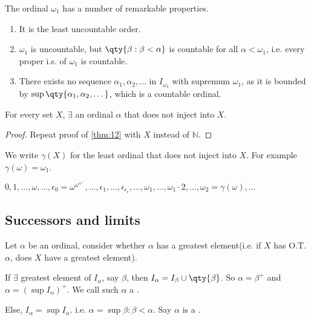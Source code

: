 The ordinal $\omega_1$ has a number of remarkable properties.
\begin{enumerate}
    \item It is the least uncountable order.
    \item $\omega_1$ is uncountable, but $\qty{\beta : \beta < \alpha}$ is countable for all $\alpha < \omega_1$, i.e. every proper i.s. of $\omega_1$ is countable.
    \item There exists no sequence $\alpha_1, \alpha_2, \dots$ in $I_{\omega_1}$ with supremum $\omega_1$, as it is bounded by $\sup\qty{\alpha_1, \alpha_2, \dots}$, which is a countable ordinal.
\end{enumerate}

\begin{theorem}
    For every set $X$, $\exists$ an ordinal $\alpha$ that does not inject into $X$.
\end{theorem}

\begin{proof}
    Repeat proof of \cref{thm:12} with $X$ instead of $\mathbb{N}$.
\end{proof}

\begin{remark}
    We write $\gamma(X)$ for the least ordinal that does not inject into $X$.
    For example $\gamma(\omega) = \omega_1$.

    $0, 1, \dots, \omega, \dots, \epsilon_0 = \omega^{\omega^{\omega^{\dots}}}, \dots, \epsilon_1, \dots, \epsilon_{\epsilon_{\epsilon}}, \dots, \omega_1, \dots, \omega_1 \cdot 2, \dots, \omega_2 = \gamma(\omega), \dots$
\end{remark}

\subsection{Successors and limits}

Let $\alpha$ be an ordinal, consider whether $\alpha$ has a greatest element(i.e. if $X$ has O.T. $\alpha$, does $X$ have a greatest element).
\begin{definition}[Successor]
    If $\exists$ greatest element of $I_\alpha$, say $\beta$, then $I_\alpha = I_\beta \cup \qty{\beta}$.
    So $\alpha = \beta^+$ and $\alpha = (\sup I_\alpha)^+$.
    We call such $\alpha$ a .

    Else, $I_\alpha = \sup I_\alpha$. i.e. $\alpha = \sup{\beta : \beta < \alpha}$.
    Say $\alpha$ is a .
\end{definition}

